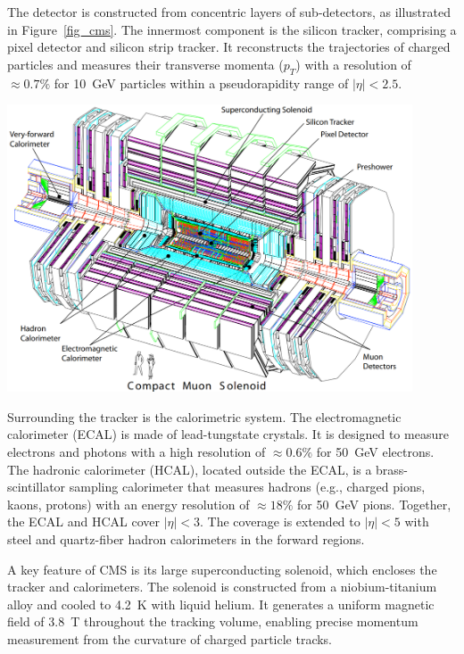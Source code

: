 The detector is constructed from concentric layers of sub-detectors, as illustrated in Figure~\ref{fig_cms}. The innermost component is the silicon tracker, comprising a pixel detector and silicon strip tracker. It reconstructs the trajectories of charged particles and measures their transverse momenta ($p_T$) with a resolution of $\approx 0.7\%$ for 10~GeV particles within a pseudorapidity range of $|\eta| < 2.5$.

\begin{center}
	\includegraphics[width=0.9\textwidth]{Images/CMS.png}
	\label{fig_cms}
\end{center}

Surrounding the tracker is the calorimetric system. The electromagnetic calorimeter (ECAL) is made of lead-tungstate crystals. It is designed to measure electrons and photons with a high resolution of $\approx 0.6\%$ for 50~GeV electrons. The hadronic calorimeter (HCAL), located outside the ECAL, is a brass-scintillator sampling calorimeter that measures hadrons (e.g., charged pions, kaons, protons) with an energy resolution of $\approx 18\%$ for 50~GeV pions. Together, the ECAL and HCAL cover $|\eta| < 3$. The coverage is extended to $|\eta| < 5$ with steel and quartz-fiber hadron calorimeters in the forward regions.

A key feature of CMS is its large superconducting solenoid, which encloses the tracker and calorimeters. The solenoid is constructed from a niobium-titanium alloy and cooled to 4.2~K with liquid helium. It generates a uniform magnetic field of 3.8~T throughout the tracking volume, enabling precise momentum measurement from the curvature of charged particle tracks.

